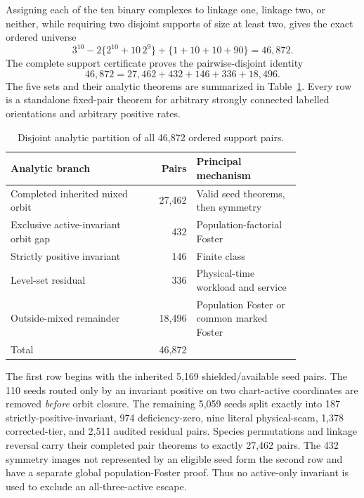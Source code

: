 \documentclass[11pt]{article}
\theoremstyle{definition}
\theoremstyle{remark}
\newcommand{\1}{\mathbf 1}
\begin{document}
Assigning each of the ten binary complexes to linkage one, linkage two, or
neither, while requiring two disjoint supports of size at least two, gives
the exact ordered universe
\begin{equation}\label{eq:46872}
 3^{10}-2\{2^{10}+10\,2^9\}+\{1+10+10+90\}=46{,}872.
\end{equation}
The complete support certificate proves the pairwise-disjoint identity
\begin{equation}\label{eq:final-union}
 46{,}872=27{,}462+432+146+336+18{,}496.
\end{equation}
The five sets and their analytic theorems are summarized in
Table~\ref{tab:branches}.  Every row is a standalone fixed-pair theorem for
arbitrary strongly connected labelled orientations and arbitrary positive
rates.

\begin{table}[ht]
\centering
\small
\caption{Disjoint analytic partition of all 46,872 ordered support pairs.}
\label{tab:branches}
\begin{tabular}{p{0.46\linewidth}r p{0.36\linewidth}}
\toprule
Analytic branch & Pairs & Principal mechanism\\
\midrule
Completed inherited mixed orbit & 27,462 & Valid seed theorems, then symmetry\\
Exclusive active-invariant orbit gap & 432 & Population-factorial Foster\\
Strictly positive invariant & 146 & Finite class\\
Level-set residual & 336 & Physical-time workload and service\\
Outside-mixed remainder & 18,496 & Population Foster or common marked Foster\\
\midrule
Total & 46,872 &\\
\bottomrule
\end{tabular}
\end{table}

The first row begins with the inherited 5,169 shielded/available seed pairs.
The 110 seeds routed only by an invariant positive on two chart-active
coordinates are removed \emph{before} orbit closure.  The remaining 5,059
seeds split exactly into 187 strictly-positive-invariant, 974
deficiency-zero, nine literal physical-seam, 1,378 corrected-tier, and 2,511
audited residual pairs.  Species permutations and linkage reversal carry
their completed pair theorems to exactly 27,462 pairs.  The 432 symmetry
images not represented by an eligible seed form the second row and have a
separate global population-Foster proof.  Thus no active-only invariant is
used to exclude an all-three-active escape.
\end{document}
